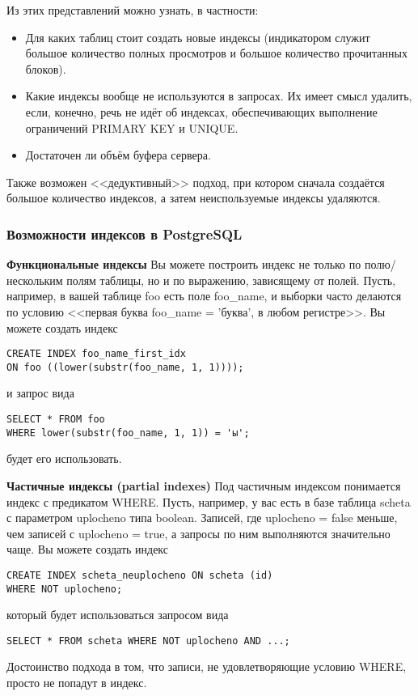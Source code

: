 Из этих представлений можно узнать, в частности:
\begin{itemize}
 \item Для каких таблиц стоит создать новые индексы (индикатором служит большое количество полных просмотров и большое количество 
прочитанных блоков).
 \item Какие индексы вообще не используются в запросах. Их имеет смысл удалить, если, конечно, речь не идёт об индексах, 
обеспечивающих выполнение ограничений PRIMARY KEY и UNIQUE.
 \item Достаточен ли объём буфера сервера.
\end{itemize}

Также возможен <<дедуктивный>> подход, при котором сначала создаётся большое количество индексов, а затем неиспользуемые индексы удаляются.

\subsubsection{Возможности индексов в PostgreSQL}
\textbf{Функциональные индексы} Вы можете построить индекс не только по полю/нескольким полям таблицы, но и по выражению, зависящему от полей.
Пусть, например, в вашей таблице foo есть поле foo\_name, и выборки часто делаются по условию 
<<первая буква foo\_name = 'буква', в любом регистре>>.
Вы можете создать индекс
\begin{verbatim}
CREATE INDEX foo_name_first_idx 
ON foo ((lower(substr(foo_name, 1, 1))));
\end{verbatim}
и запрос вида
\begin{verbatim}
SELECT * FROM foo 
WHERE lower(substr(foo_name, 1, 1)) = 'ы';
\end{verbatim}
будет его использовать.

\textbf{Частичные индексы (partial indexes)} Под частичным индексом понимается индекс с предикатом WHERE. Пусть, например, 
у вас есть в базе таблица scheta с параметром uplocheno типа boolean. Записей, где uplocheno = false меньше, чем записей 
с uplocheno = true, а запросы по ним выполняются значительно чаще. Вы можете создать индекс
\begin{verbatim}
CREATE INDEX scheta_neuplocheno ON scheta (id)
WHERE NOT uplocheno;
\end{verbatim}
который будет использоваться запросом вида
\begin{verbatim}
SELECT * FROM scheta WHERE NOT uplocheno AND ...;
\end{verbatim}
Достоинство подхода в том, что записи, не удовлетворяющие условию WHERE,
просто не попадут в индекс.

